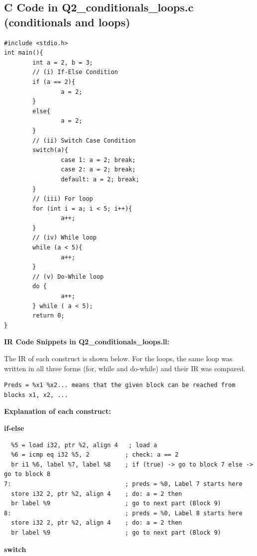 \documentclass[11pt,a4paper]{article}
\begin{document}
\subsection{C Code in Q2\_conditionals\_loops.c (conditionals and loops)}

\begin{lstlisting}
#include <stdio.h>
int main(){
        int a = 2, b = 3;
        // (i) If-Else Condition
        if (a == 2){
                a = 2;
        }
        else{
                a = 2;
        }
        // (ii) Switch Case Condition
        switch(a){
                case 1: a = 2; break;
                case 2: a = 2; break;
                default: a = 2; break;
        }
        // (iii) For loop
        for (int i = a; i < 5; i++){
                a++;
        }
        // (iv) While loop
        while (a < 5){
                a++;
        }
        // (v) Do-While loop
        do {
                a++;
        } while ( a < 5);
        return 0;
}
\end{lstlisting}

\medskip\noindent\textbf{IR Code Snippets in Q2\_conditionals\_loops.ll:}\par

The IR of each construct is shown below. For the loops, the same loop was written in all three forms (for, while and do-while) and their IR was compared.


\begin{lstlisting}
Preds = %x1 %x2... means that the given block can be reached from blocks x1, x2, ...
\end{lstlisting}

\textbf{Explanation of each construct:}


\textbf{if-else}


\begin{lstlisting}
  %5 = load i32, ptr %2, align 4   ; load a
  %6 = icmp eq i32 %5, 2          ; check: a == 2
  br i1 %6, label %7, label %8    ; if (true) -> go to block 7 else -> go to block 8
7:                                ; preds = %0, Label 7 starts here
  store i32 2, ptr %2, align 4    ; do: a = 2 then
  br label %9                     ; go to next part (Block 9)
8:                                ; preds = %0, Label 8 starts here
  store i32 2, ptr %2, align 4    ; do: a = 2 then
  br label %9                     ; go to next part (Block 9)
\end{lstlisting}

\textbf{switch}
\end{document}
